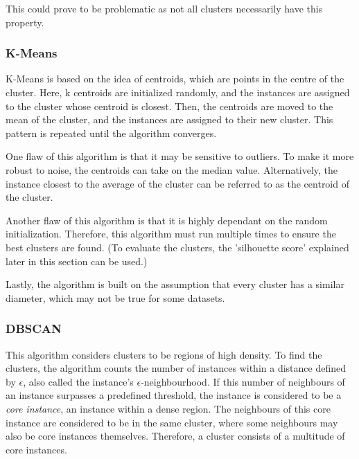 This could prove to be problematic as not all clusters necessarily have this property.

\subsubsection{K-Means }

K-Means\citep{lloydLeastSquaresQuantization1982} is based on the idea of centroids, which are points in the centre of the cluster. Here, k centroids are initialized randomly, and the instances are assigned to the cluster whose centroid is closest. Then, the centroids are moved to the mean of the cluster, and the instances are assigned to their new cluster. This pattern is repeated until the algorithm converges.

One flaw of this algorithm is that it may be sensitive to outliers. To make it more robust to noise, the centroids can take on the median value. Alternatively, the instance closest to the average of the cluster can be referred to as the centroid of the cluster.

Another flaw of this algorithm is that it is highly dependant on the random initialization. Therefore, this algorithm must run multiple times to ensure the best clusters are found. (To evaluate the clusters, the 'silhouette score' explained later in this section can be used.)

Lastly, the algorithm is built on the assumption that every cluster has a similar diameter, which may not be true for some datasets.

\subsubsection{DBSCAN}

This algorithm considers clusters to be regions of high density. To find the clusters, the algorithm counts the number of instances within a distance defined by $\epsilon$, also called the instance's $\epsilon$-neighbourhood. If this number of neighbours of an instance surpasses a predefined threshold, the instance is considered to be a \textit{core instance}, an instance within a dense region. The neighbours of this core instance are considered to be in the same cluster, where some neighbours may also be core instances themselves. Therefore, a cluster consists of a multitude of core instances.


